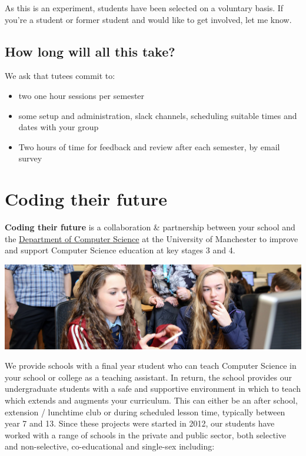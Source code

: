 \documentclass[12pt,]{book}
\providecommand{\tightlist}{%
  \setlength{\itemsep}{0pt}\setlength{\parskip}{0pt}}
\begin{document}
As this is an experiment, students have been selected on a voluntary basis. If you're a student or former student and would like to get involved, let me know.

\hypertarget{how-long-will-all-this-take}{%
\section{How long will all this take?}\label{how-long-will-all-this-take}}

We ask that tutees commit to:

\begin{itemize}
\tightlist
\item
  two one hour sessions per semester
\item
  some setup and administration, slack channels, scheduling suitable times and dates with your group
\item
  Two hours of time for feedback and review after each semester, by email survey
\end{itemize}

\hypertarget{coding-their-future}{%
\chapter{Coding their future}\label{coding-their-future}}

\textbf{Coding their future} is a collaboration \& partnership between your school and the \href{https://www.cs.manchester.ac.uk/}{Department of Computer Science} at the University of Manchester to improve and support Computer Science education at key stages 3 and 4.\citep{afterthereboot} \citep{cambridgegcse}

\begin{center}\includegraphics[width=1\linewidth]{images/schools-banner} \end{center}

We provide schools with a final year student who can teach Computer Science in your school or college as a teaching assistant. In return, the school provides our undergraduate students with a safe and supportive environment in which to teach which extends and augments your curriculum. This can either be an after school, extension / lunchtime club or during scheduled lesson time, typically between year 7 and 13. Since these projects were started in 2012, our students have worked with a range of schools in the private and public sector, both selective and non-selective, co-educational and single-sex including:
\end{document}
